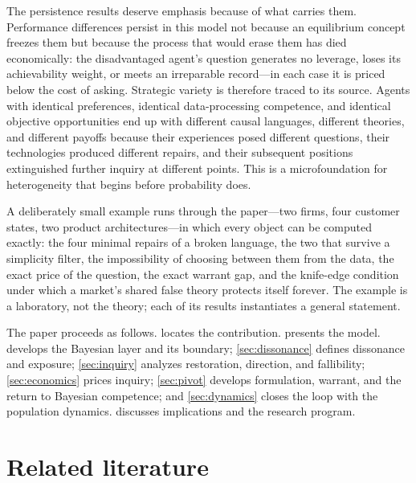 \documentclass[11pt]{article}
\theoremstyle{definition}
\begin{document}
The persistence results deserve emphasis because of what carries them.
Performance differences persist in this model not because an equilibrium concept freezes them but because the process that would erase them has died economically: the disadvantaged agent's question generates no leverage, loses its achievability weight, or meets an irreparable record---in each case it is priced below the cost of asking.
Strategic variety is therefore traced to its source.
Agents with identical preferences, identical data-processing competence, and identical objective opportunities end up with different causal languages, different theories, and different payoffs because their experiences posed different questions, their technologies produced different repairs, and their subsequent positions extinguished further inquiry at different points.
This is a microfoundation for heterogeneity that begins before probability does.

A deliberately small example runs through the paper---two firms, four customer states, two product architectures---in which every object can be computed exactly: the four minimal repairs of a broken language, the two that survive a simplicity filter, the impossibility of choosing between them from the data, the exact price of the question, the exact warrant gap, and the knife-edge condition under which a market's shared false theory protects itself forever.
The example is a laboratory, not the theory; each of its results instantiates a general statement.

The paper proceeds as follows.
 locates the contribution.
 presents the model.
 develops the Bayesian layer and its boundary; \cref{sec:dissonance} defines dissonance and exposure; \cref{sec:inquiry} analyzes restoration, direction, and fallibility; \cref{sec:economics} prices inquiry; \cref{sec:pivot} develops formulation, warrant, and the return to Bayesian competence; and \cref{sec:dynamics} closes the loop with the population dynamics.
 discusses implications and the research program.
\section{Related literature}
\label{sec:literature}
\end{document}
